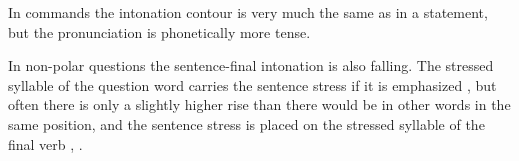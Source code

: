

In commands the intonation contour is very much the same as in a statement, but the pronunciation is phonetically more tense.


In non-polar questions the sentence-final intonation is also falling. The stressed syllable of the question word carries the sentence stress if it is emphasized , but often there is only a slightly higher rise than there would be in other words in the same position, and the sentence stress is placed on the stressed syllable of the final verb , .









